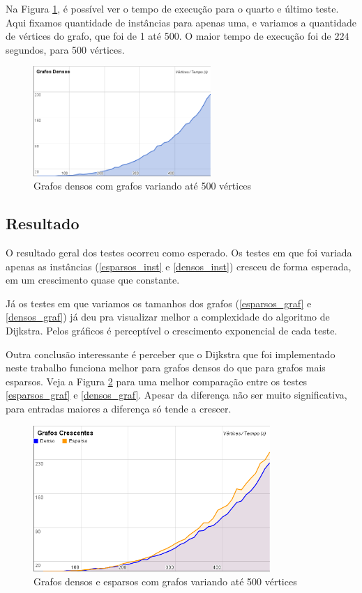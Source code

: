 \documentclass[12pt]{article}
\begin{document}
	Na Figura \ref{den_graf_var}, é possível ver o tempo de execução para o quarto e último teste. Aqui fixamos quantidade de instâncias para apenas uma, e variamos a quantidade de vértices do grafo, que foi de 1 até 500. O maior tempo de execução foi de $224$ segundos, para 500 vértices.

\begin{figure}[h!]
	\centering
	\includegraphics[width=0.60\textwidth]{graph_denso_grafvar.png}
	\caption{Grafos densos com grafos variando até 500 vértices}
	\label{den_graf_var}
\end{figure}

\subsection{Resultado}

	O resultado geral dos testes ocorreu como esperado. Os testes em que foi variada apenas as instâncias (\ref{esparsos_inst} e \ref{densos_inst}) cresceu de forma esperada, em um crescimento quase que constante.

    Já os testes em que variamos os tamanhos dos grafos (\ref{esparsos_graf} e \ref{densos_graf}) já deu pra visualizar melhor a complexidade do algoritmo de Dijkstra. Pelos gráficos é perceptível o crescimento exponencial de cada teste.

    Outra conclusão interessante é perceber que o Dijkstra que foi implementado neste trabalho funciona melhor para grafos densos do que para grafos mais esparsos. Veja a Figura \ref{graf_var} para uma melhor comparação entre os testes \ref{esparsos_graf} e \ref{densos_graf}. Apesar da diferença não ser muito significativa, para entradas maiores a diferença só tende a crescer.

    \begin{figure}[h!]
        \centering
        \includegraphics[width=0.80\textwidth]{graph_grafvar.png}
        \caption{Grafos densos e esparsos com grafos variando até 500 vértices}
        \label{graf_var}
    \end{figure}
\end{document}
